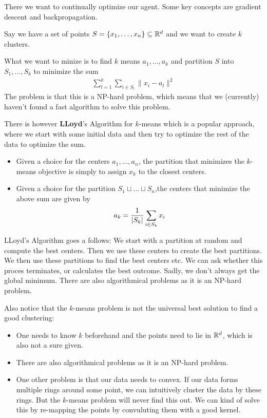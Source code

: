 There we want to continually optimize our agent. Some key concepts are gradient descent and backpropagation.


Say we have a set of points $S = \{x_{1}, \ldots, x_{n}\} \subseteq \mathbb{R}^{d}$ and we want to create $k$ clusters.

What we want to minize is to find $k$ means $a_{1}, \ldots, a_{k}$ and partition $S$ into $S_{1}, \ldots, S_{k}$ to minimize the sum
\begin{align*}
  \sum_{l=1}^{k}\sum_{i \in S_l}\|x_i - a_l\|^{2}
\end{align*}
The problem is that this is a NP-hard problem, which means that we (currently) haven't found a fast algorithm to solve this problem.

There is however \textbf{LLoyd}'s Algorithm for $k$-means which is a popular approach, where we start with some initial data and then try to optimize the rest of the data to optimize the sum.
\begin{prop}[]
  \begin{itemize}
    \item Given a choice for the centers $a_{1}, \ldots, a_{n}$, the partition that minimizes the $k$-means objective is simply to assign $x_k$ to the closest centers.
    \item Given a choice for the partition $S_1\sqcup \ldots \sqcup S_n$,the centers that minimize the above sum are given by
      \begin{align*}
        a_k = \frac{1}{\vert S_k\vert} \sum_{i \in S_k}x_i
      \end{align*}
  \end{itemize}
\end{prop}

LLoyd's Algorithm goes a follows: We start with a partition at random and compute the best centers. Then we use these centers to create the best partitions. 
We then use these partitions to find the best centers etc.
We can ask whether this proces terminates, or calculates the best outcome.
Sadly, we don't always get the global minimum.
There are also algorithmical problems as it is an NP-hard problem.

Also notice that the $k$-means problem is not the universal best solution to find a good clustering:
\begin{itemize}
  \item 
    One needs to know $k$ beforehand and the points need to lie in $\mathbb{R}^{d}$, which is also not a sure given.
  \item There are also algorithmical problems as it is an NP-hard problem.
  \item 
    One other problem is that our data needs to convex. If our data forms multiple rings around some point, we can intuitively cluster the data by these rings. But the $k$-means problem will never find this out.
    We can kind of solve this by re-mapping the points by convuluting them with a good kernel.
\end{itemize}
